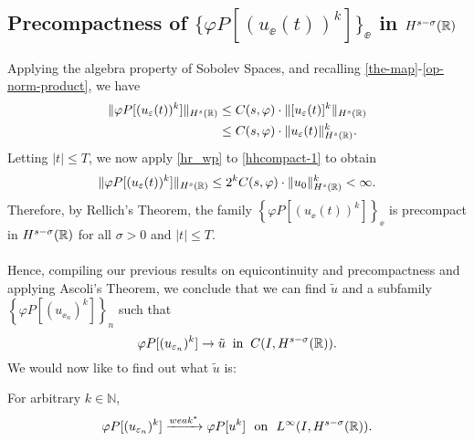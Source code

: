 \subsection{Precompactness of $\{\varphi P [(u_\ee(t))^k]\}_\ee$ in
$H^{s-\sigma  }(\mathbb{R})$}
Applying the algebra property of Sobolev
Spaces, and recalling \eqref{the-map}-\eqref{op-norm-product}, we have
\begin{equation}
\begin{split}
\label{hhcompact-1}
\|\varphi P [(u_\varepsilon(t))^k]\|_{H^{s}(\mathbb{R})}
& \le  C(s, \varphi) \cdot \|[u_\varepsilon(t)]^k\|_{H^{s}(\mathbb{R})}
\\
& \le C(s, \varphi) \cdot \|u_\varepsilon(t)\|^k_{H^{s}(\mathbb{R})}.
\end{split}
\end{equation}
%
Letting $|t| \le T$, we now apply \cref{hr_wp} to
\eqref{hhcompact-1} to obtain
\begin{equation*}
\begin{split}
\|\varphi P [(u_\varepsilon(t))^k]\|_{H^{s}(\mathbb{R})}
\le 2^k C(s, \varphi) \cdot  \|u_0 \|^k_{H^s(\mathbb{R})} < \infty.
\end{split}
\end{equation*}
Therefore, by Rellich's Theorem, the family $\left\{
\varphi P [(u_\ee(t))^k] \right\}_\ee$ is
precompact in $H^{s- \sigma }(\mathbb{R})$ for all $\sigma > 0$ and $|t| \le T$. 
\\
\\
Hence, compiling our previous results on equicontinuity and precompactness
and applying Ascoli's Theorem, we
conclude that we can find $\tilde{u}$ and a subfamily 
\\ $\left\{
\varphi P [(u_{\ee_n})^k]
\right\}_n$ such that
\begin{equation}
\label{hhstrong-conv-of-u_ep}
\varphi P [(u_{\varepsilon_n})^k] \to \tilde{u}
\; \; \text{in} \; \; C(I, H^{s-\sigma}(\mathbb{R})).
\end{equation}
%
%
We would now like to find out what $\tilde{u}$ is:
%
%
%
\begin{lemma}
\label{hhlem:crit-conv}
For arbitrary $k \in \mathbb{N}$,
\begin{equation}
\begin{split}
\varphi P [(u_{\varepsilon_n})^k] \xrightarrow{weak^*}
\varphi P [u^k] \ \ \text{on} \ \ L^\infty(I,
H^{s-\sigma}(\mathbb{R})).
\label{hhcrit-conv-est}
\end{split}
\end{equation}
\end{lemma}
